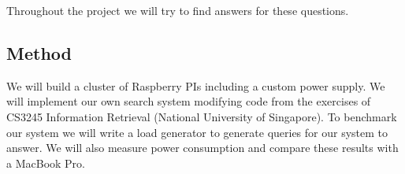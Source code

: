 Throughout the project we will try to find answers for these questions.

\subsection{Method}
We will build a cluster of Raspberry PIs including a custom power supply. We will implement our own search system modifying code from the exercises of CS3245 Information Retrieval (National University of Singapore). To benchmark our system we will write a load generator to generate queries for our system to answer. We will also measure power consumption and compare these results with a MacBook Pro. 









